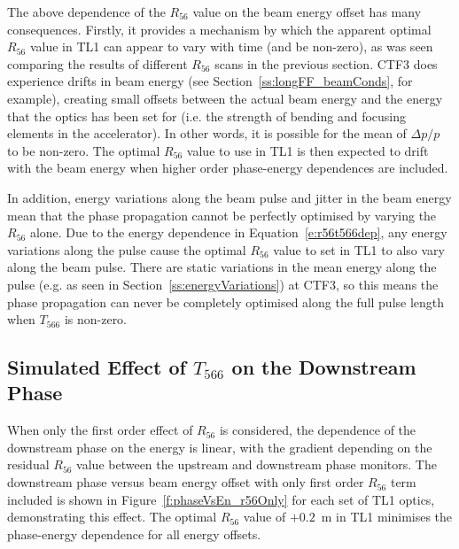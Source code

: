 The above dependence of the \(R_{56}\) value on the beam energy offset has many consequences. Firstly, it provides a mechanism by which the apparent optimal \(R_{56}\) value in TL1 can appear to vary with time (and be non-zero), as was seen comparing the results of different \(R_{56}\) scans in the previous section. CTF3 does experience drifts in beam energy (see Section~\ref{ss:longFF_beamConds}, for example), creating small offsets between the actual beam energy and the energy that the optics has been set for (i.e. the strength of bending and focusing elements in the accelerator). In other words, it is possible for the mean of \(\Delta p / p\) to be non-zero. The optimal \(R_{56}\) value to use in TL1 is then expected to drift with the beam energy when higher order phase-energy dependences are included.

In addition, energy variations along the beam pulse and jitter in the beam energy mean that the phase propagation cannot be perfectly optimised by varying the \(R_{56}\) alone. Due to the energy dependence in Equation~\ref{e:r56t566dep}, any energy variations along the pulse cause the optimal \(R_{56}\) value to set in TL1 to also vary along the beam pulse. There are static variations in the mean energy along the pulse (e.g. as seen in Section~\ref{ss:energyVariations}) at CTF3, so this means the phase propagation can never be completely optimised along the full pulse length when \(T_{566}\) is non-zero. 

\subsection{Simulated Effect of \(T_{566}\) on the Downstream Phase}
\label{ss:t566Sim}

When only the first order effect of \(R_{56}\) is considered, the dependence of the downstream phase on the energy is linear, with the gradient depending on the residual \(R_{56}\) value between the upstream and downstream phase monitors. The downstream phase versus beam energy offset with only first order \(R_{56}\) term included is shown in Figure~\ref{f:phaseVsEn_r56Only} for each set of TL1 optics, demonstrating this effect. The optimal \(R_{56}\) value of \(+0.2\)~m in TL1 minimises the phase-energy dependence for all energy offsets.

